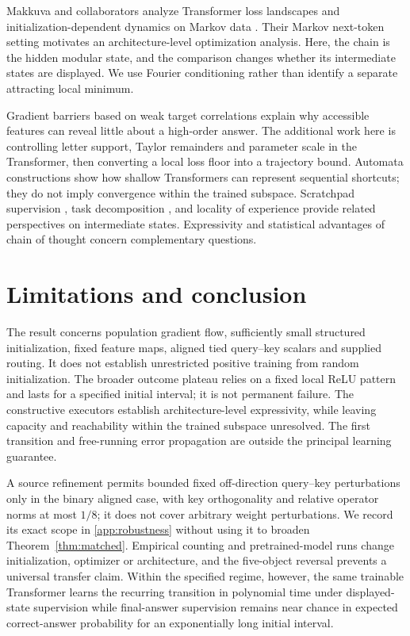 Makkuva and collaborators analyze Transformer loss landscapes and initialization-dependent dynamics on Markov data \citep{makkuva2025attention,makkuva2024local}. Their Markov next-token setting motivates an architecture-level optimization analysis. Here, the chain is the hidden modular state, and the comparison changes whether its intermediate states are displayed. We use Fourier conditioning rather than identify a separate attracting local minimum.

Gradient barriers based on weak target correlations \citep{shalevshwartz2017failures,abbe2025parities} explain why accessible features can reveal little about a high-order answer. The additional work here is controlling letter support, Taylor remainders and parameter scale in the Transformer, then converting a local loss floor into a trajectory bound. Automata constructions \citep{liu2023automata} show how shallow Transformers can represent sequential shortcuts; they do not imply convergence within the trained subspace. Scratchpad supervision \citep{nye2021scratchpads}, task decomposition \citep{wies2023subtask}, and locality of experience \citep{prystawski2023think} provide related perspectives on intermediate states. Expressivity and statistical advantages of chain of thought \citep{merrill2024expressive,wen2024sparse} concern complementary questions.

\section{Limitations and conclusion}\label{sec:conclusion}
The result concerns population gradient flow, sufficiently small structured initialization, fixed feature maps, aligned tied query--key scalars and supplied routing. It does not establish unrestricted positive training from random initialization. The broader outcome plateau relies on a fixed local ReLU pattern and lasts for a specified initial interval; it is not permanent failure. The constructive executors establish architecture-level expressivity, while leaving capacity and reachability within the trained subspace unresolved. The first transition and free-running error propagation are outside the principal learning guarantee.

A source refinement permits bounded fixed off-direction query--key perturbations only in the binary aligned case, with key orthogonality and relative operator norms at most $1/8$; it does not cover arbitrary weight perturbations. We record its exact scope in \cref{app:robustness} without using it to broaden Theorem~\ref{thm:matched}. Empirical counting and pretrained-model runs change initialization, optimizer or architecture, and the five-object reversal prevents a universal transfer claim. Within the specified regime, however, the same trainable Transformer learns the recurring transition in polynomial time under displayed-state supervision while final-answer supervision remains near chance in expected correct-answer probability for an exponentially long initial interval.
